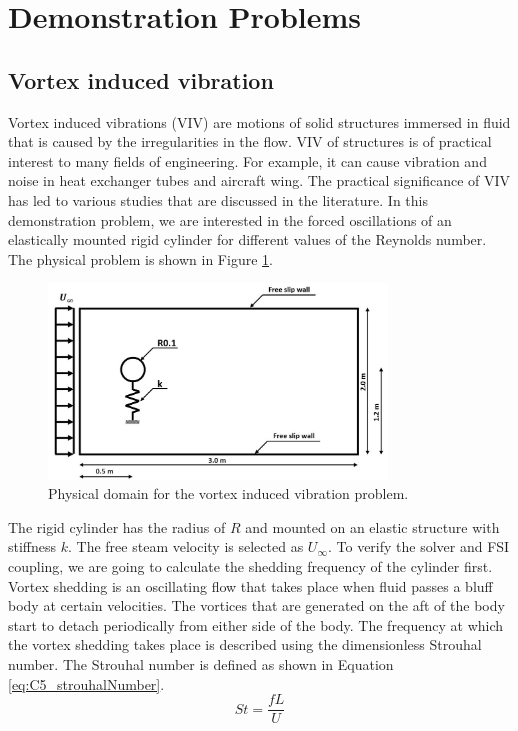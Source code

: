 \section{Demonstration Problems}
\subsection{Vortex induced vibration}
Vortex induced vibrations (VIV) are motions of solid structures immersed in fluid that is caused by the irregularities in the flow. VIV of structures is of practical interest to many fields of engineering. For example, it can cause vibration and noise in heat exchanger tubes and aircraft wing. The practical significance of VIV has led to various studies that are discussed in the literature\cite{williamson2004vortex}. In this demonstration problem, we are interested in the forced oscillations of an elastically mounted rigid cylinder for different values of the Reynolds number. The physical problem is shown in Figure \ref{fig:C5_cylinderShape}.
%
\begin{figure}[H]
    \centering
    \includegraphics[width=9.00cm]{Chapter_5/figure/VIV_domain_shape.jpg}
    \caption{Physical domain for the vortex induced vibration problem.}
    \label{fig:C5_cylinderShape}
\end{figure}
%
The rigid cylinder has the radius of $R$ and mounted on an elastic structure with stiffness $k$. The free steam velocity is selected as $U_\infty$. To verify the solver and FSI coupling, we are going to calculate the shedding frequency of the cylinder first. Vortex shedding is an oscillating flow that takes place when fluid passes a bluff body at certain velocities. The vortices that are generated on the aft of the body start to detach periodically from either side of the body. The frequency at which the vortex shedding takes place is described using the dimensionless Strouhal number. The Strouhal number is defined as shown in Equation \eqref{eq:C5_strouhalNumber}.
%
\begin{equation}\label{eq:C5_strouhalNumber}
	St = \frac{fL}{U}
\end{equation}
